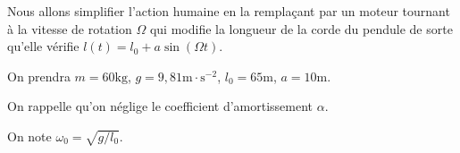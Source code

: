 \begin{minipage}[c]{.40\linewidth}
Nous allons simplifier l'action humaine en la remplaçant par un moteur  tournant à la vitesse de rotation $\Omega$ qui  modifie la longueur de la corde du pendule de sorte qu'elle vérifie 
$l(t) = l_0 + a \sin(\Omega t)$.


On prendra $m = 60\text{kg}$, $g = 9,81\text{m}\cdot\text{s}^{-2}$, $l_0 = 65\text{m}$, $a = 10\text{m}$.

On rappelle qu'on néglige le coefficient d'amortissement $\alpha$.

On note $\omega_0 =\sqrt{g/l_0}$.
\end{minipage}  
\begin{minipage}[c]{.60\linewidth}
\begin{center}
\end{center}
\end{minipage}  
